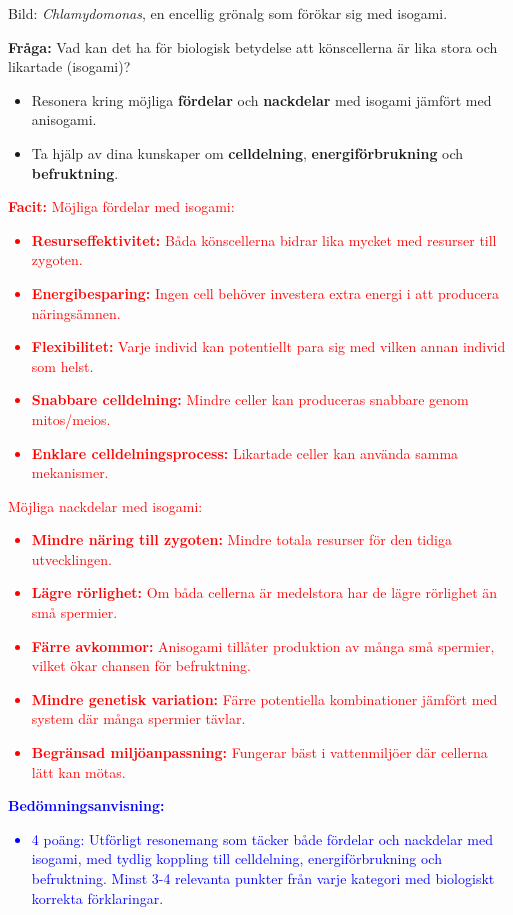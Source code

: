 \documentclass{exam}
\newcommand{\facit}[1]{\textcolor{red}{\textbf{Facit:} #1}}
\newcommand{\bedomning}[1]{\textcolor{blue}{\textbf{Bedömningsanvisning:} #1}}
\begin{document}
\begin{questions}
\begin{center}
    \small{Bild: \textit{Chlamydomonas}, en encellig grönalg som förökar sig med isogami.}
\end{center}

\textbf{Fråga:} Vad kan det ha för biologisk betydelse att könscellerna är lika stora och likartade (isogami)?
\begin{itemize}
  \item Resonera kring möjliga \textbf{fördelar} och \textbf{nackdelar} med isogami jämfört med anisogami.
  \item Ta hjälp av dina kunskaper om \textbf{celldelning}, \textbf{energiförbrukning} och \textbf{befruktning}.
\end{itemize}

\facit{
Möjliga fördelar med isogami:
\begin{itemize}
  \item \textbf{Resurseffektivitet:} Båda könscellerna bidrar lika mycket med resurser till zygoten.
  \item \textbf{Energibesparing:} Ingen cell behöver investera extra energi i att producera näringsämnen.
  \item \textbf{Flexibilitet:} Varje individ kan potentiellt para sig med vilken annan individ som helst.
  \item \textbf{Snabbare celldelning:} Mindre celler kan produceras snabbare genom mitos/meios.
  \item \textbf{Enklare celldelningsprocess:} Likartade celler kan använda samma mekanismer.
\end{itemize}

Möjliga nackdelar med isogami:
\begin{itemize}
  \item \textbf{Mindre näring till zygoten:} Mindre totala resurser för den tidiga utvecklingen.
  \item \textbf{Lägre rörlighet:} Om båda cellerna är medelstora har de lägre rörlighet än små spermier.
  \item \textbf{Färre avkommor:} Anisogami tillåter produktion av många små spermier, vilket ökar chansen för befruktning.
  \item \textbf{Mindre genetisk variation:} Färre potentiella kombinationer jämfört med system där många spermier tävlar.
  \item \textbf{Begränsad miljöanpassning:} Fungerar bäst i vattenmiljöer där cellerna lätt kan mötas.
\end{itemize}
}

\bedomning{
\begin{itemize}
  \item 4 poäng: Utförligt resonemang som täcker både fördelar och nackdelar med isogami, med tydlig koppling till celldelning, energiförbrukning och befruktning. Minst 3-4 relevanta punkter från varje kategori med biologiskt korrekta förklaringar.
  

\end{itemize}}
\end{questions}
\end{document}
